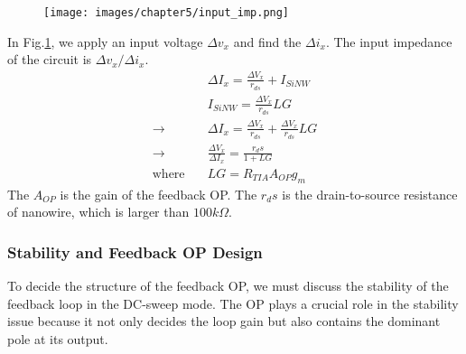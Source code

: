 {\begin{figure}[!htbp]
    \centering
        \texttt{[image: images/chapter5/input\_imp.png]}
    \caption{}
    \label{fig:input_imp}
\end{figure}
In Fig.\ref{fig:input_imp}, we apply an input voltage $\Delta v_x$ and find the $\Delta i_x$.
The input impedance of the circuit is $\Delta v_x / \Delta i_x$.
\begin{align}
    & \Delta I_x = \frac{\Delta V_x}{r_{ds}} + I_{SiNW} \\
    & I_{SiNW} = \frac{\Delta V_x}{r_{ds}} LG \\
    \rightarrow \quad & \Delta I_x = \frac{\Delta V_x}{r_{ds}} + \frac{\Delta V_x}{r_{ds}} LG \\
    \rightarrow \quad & \frac{\Delta V_x}{\Delta I_x} = \frac{r_ds}{1 + LG} \label{eq:input_imp} \\
    \text{where}\quad & LG = R_{TIA}A_{OP} g_m
\end{align}
The $A_{OP}$ is the gain of the feedback OP.
The $r_ds$ is the drain-to-source resistance of nanowire, which is larger than $100k\Omega$.




\subsubsection{Stability and Feedback OP Design} \label{sec:stabilityandOP}
To decide the structure of the feedback OP, we must discuss the stability of the feedback loop in the DC-sweep mode.
The OP plays a crucial role in the stability issue because it not only decides the loop gain but also contains the dominant pole at its output.

}

